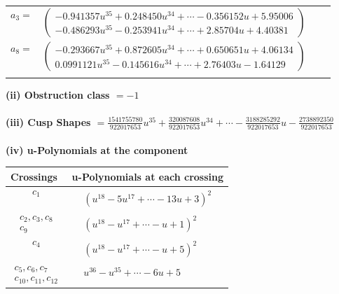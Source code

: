 \documentclass[1p]{elsarticle_modified}
\theoremstyle{definition}
\begin{document}
\begin{tabular}{m{7pt} m{180pt} m{7pt} m{180pt} }
\flushright $a_{3}=$&$\begin{pmatrix}-0.941357 u^{35}+0.248450 u^{34}+\cdots-0.356152 u+5.95006\\-0.486293 u^{35}-0.253941 u^{34}+\cdots+2.85704 u+4.40381\end{pmatrix}$ \\
\flushright $a_{8}=$&$\begin{pmatrix}-0.293667 u^{35}+0.872605 u^{34}+\cdots+0.650651 u+4.06134\\0.0991121 u^{35}-0.145616 u^{34}+\cdots+2.76403 u-1.64129\end{pmatrix}$\\&\end{tabular}
\flushleft \textbf{(ii) Obstruction class $= -1$}\\~\\
\flushleft \textbf{(iii) Cusp Shapes $= \frac{1541755780}{922017653} u^{35}+\frac{320087608}{922017653} u^{34}+\cdots-\frac{3188285292}{922017653} u-\frac{2738892350}{922017653}$}\\~\\
\newpage\renewcommand{\arraystretch}{1}
\flushleft \textbf{(iv) u-Polynomials at the component}\newline \\
\begin{tabular}{m{50pt}|m{274pt}}
Crossings & \hspace{64pt}u-Polynomials at each crossing \\
\hline $$\begin{aligned}c_{1}\end{aligned}$$&$\begin{aligned}
&(u^{18}-5 u^{17}+\cdots-13 u+3)^{2}
\end{aligned}$\\
\hline $$\begin{aligned}c_{2},c_{3},c_{8}\\c_{9}\end{aligned}$$&$\begin{aligned}
&(u^{18}- u^{17}+\cdots- u+1)^{2}
\end{aligned}$\\
\hline $$\begin{aligned}c_{4}\end{aligned}$$&$\begin{aligned}
&(u^{18}- u^{17}+\cdots- u+5)^{2}
\end{aligned}$\\
\hline $$\begin{aligned}c_{5},c_{6},c_{7}\\c_{10},c_{11},c_{12}\end{aligned}$$&$\begin{aligned}
&u^{36}- u^{35}+\cdots-6 u+5
\end{aligned}$\\
\hline
\end{tabular}\\~\\
\end{document}
